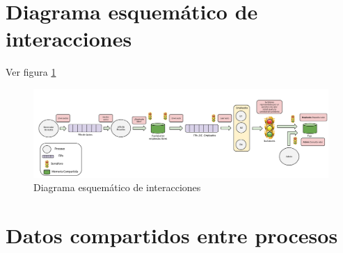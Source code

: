 \documentclass[12pt,a4paper,spanish]{article}
\begin{document}
	\section{Diagrama esquemático de interacciones}
	
	Ver figura \ref{diagrama}

\begin{figure}
\label{diagrama}
\includegraphics[angle=90, scale = 0.34]{esquema.png}
\centering
\caption{Diagrama esquemático de interacciones}
\end{figure}

\newpage
	\section{Datos compartidos entre procesos}
	
\end{document}
